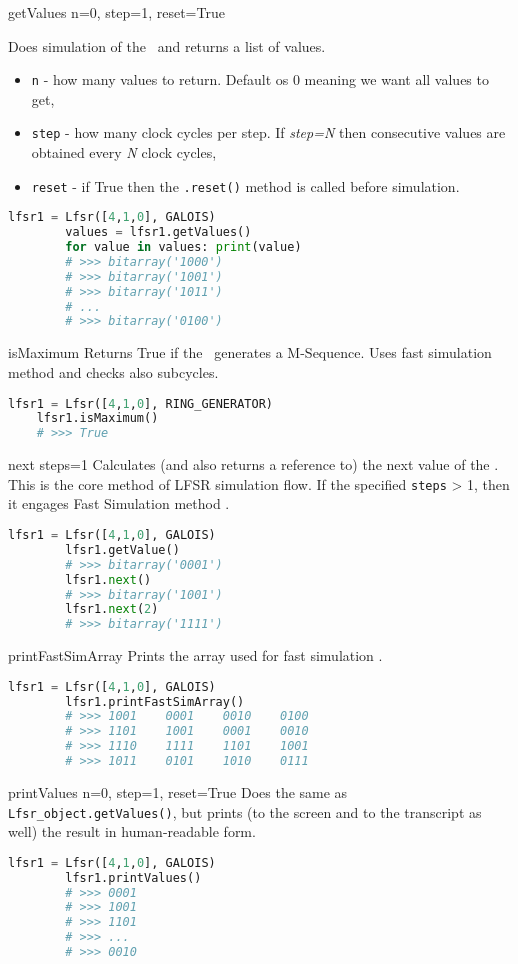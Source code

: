  {getValues} {n=0, step=1, reset=True} {
	Does simulation of the \Lfsr\ and returns a list of values.
	\begin{itemize}
		\item \texttt{n} - how many values to return. Default os 0 meaning we want all values to get,
		\item \texttt{step} - how many clock cycles per step. If \textit{step=N} then consecutive values are obtained every \textit{N} clock cycles,
		\item \texttt{reset} - if True then the \texttt{.reset()} method is called before simulation.
	\end{itemize}
}
\begin{lstlisting}[language=Python]
		lfsr1 = Lfsr([4,1,0], GALOIS)
		values = lfsr1.getValues()
		for value in values: print(value)
		# >>> bitarray('1000')
		# >>> bitarray('1001')
		# >>> bitarray('1011')
		# ...
		# >>> bitarray('0100')
\end{lstlisting}


 {isMaximum} {} {
	Returns True if the \Lfsr\ generates a M-Sequence. Uses fast simulation method \cite{lfsr:fastsim} and checks also subcycles.
}
\begin{lstlisting}[language=Python]
	lfsr1 = Lfsr([4,1,0], RING_GENERATOR)
	lfsr1.isMaximum()
	# >>> True
\end{lstlisting}

\label{lfsr:next}
 {next} {steps=1} {
	Calculates (and also returns a reference to) the next value of the \Lfsr. This is the core method of LFSR simulation flow. If the specified \texttt{steps} > 1, then it engages Fast Simulation method \cite{lfsr:fastsim}. 
}
\begin{lstlisting}[language=Python]
		lfsr1 = Lfsr([4,1,0], GALOIS)
		lfsr1.getValue()
		# >>> bitarray('0001')
		lfsr1.next()
		# >>> bitarray('1001')
		lfsr1.next(2)
		# >>> bitarray('1111')
\end{lstlisting}

 {printFastSimArray} {} {
	Prints the array used for fast simulation \cite{lfsr:fastsim}.
}
\begin{lstlisting}[language=Python]
		lfsr1 = Lfsr([4,1,0], GALOIS)
		lfsr1.printFastSimArray()
		# >>> 1001    0001    0010    0100
		# >>> 1101    1001    0001    0010
		# >>> 1110    1111    1101    1001
		# >>> 1011    0101    1010    0111
\end{lstlisting}

 {printValues} {n=0, step=1, reset=True} {
	Does the same as \texttt{Lfsr\_object.getValues()}, but prints (to the screen and to the transcript as well) the result in human-readable form.
}
\begin{lstlisting}[language=Python]
		lfsr1 = Lfsr([4,1,0], GALOIS)
		lfsr1.printValues()
		# >>> 0001
		# >>> 1001
		# >>> 1101
		# >>> ...
		# >>> 0010
\end{lstlisting}

